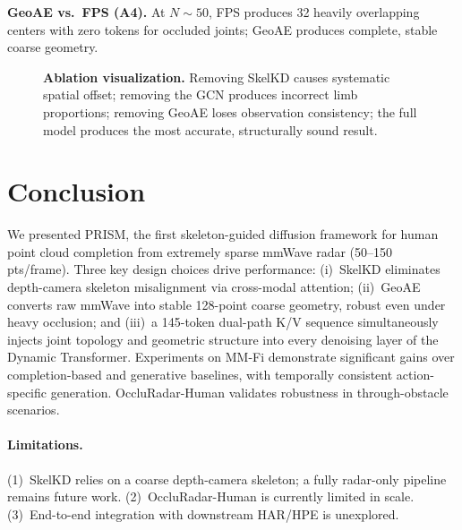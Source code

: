 \documentclass{article}
\begin{document}
\textbf{GeoAE vs.\ FPS (A4).}
At $N\!\sim\!50$, FPS produces 32 heavily overlapping centers with zero tokens
for occluded joints; GeoAE produces complete, stable coarse geometry.

\begin{figure}[t]
  \centering
  \caption{
    \textbf{Ablation visualization.}
    Removing SkelKD causes systematic spatial offset;
    removing the GCN produces incorrect limb proportions;
    removing GeoAE loses observation consistency;
    the full model produces the most accurate, structurally sound result.
  }
  \label{fig:ablation}
\end{figure}

\section{Conclusion}
\label{sec:conclusion}

We presented PRISM, the first skeleton-guided diffusion framework for
human point cloud completion from extremely sparse mmWave radar (50--150 pts/frame).
Three key design choices drive performance:
(i)~SkelKD eliminates depth-camera skeleton misalignment via cross-modal attention;
(ii)~GeoAE converts raw mmWave into stable 128-point coarse geometry,
robust even under heavy occlusion; and
(iii)~a 145-token dual-path K/V sequence simultaneously injects joint topology
and geometric structure into every denoising layer of the Dynamic Transformer.
Experiments on MM-Fi demonstrate significant gains over completion-based and
generative baselines, with temporally consistent action-specific generation.
OccluRadar-Human validates robustness in through-obstacle scenarios.

\paragraph{Limitations.}
(1)~SkelKD relies on a coarse depth-camera skeleton; a fully radar-only pipeline
remains future work.
(2)~OccluRadar-Human is currently limited in scale.
(3)~End-to-end integration with downstream HAR/HPE is unexplored.
\end{document}
